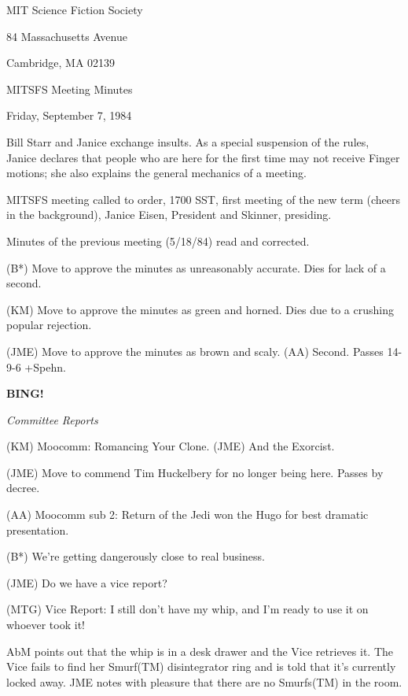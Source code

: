 \documentclass[12pt]{article}
\newcommand{\bing}{{\bf BING!} }
\newcommand{\goto}[1]{\bing \vskip 12pt \centerline{{\em{#1}}}}
\begin{document}
\begin{center}

MIT Science Fiction Society 

84 Massachusetts Avenue

Cambridge, MA 02139

\vspace{12pt}

MITSFS Meeting Minutes 

Friday, September 7, 1984

\end{center}
 
\vspace{18pt}

\setlength{\parskip}{6pt}

\noindent
Bill Starr and Janice exchange insults. As a special suspension of the rules, Janice declares that people who are here for the first time may not receive Finger motions; she also explains the general mechanics of a meeting.

MITSFS meeting called to order, 1700 SST, first meeting of the new term (cheers in the background),
Janice Eisen, President and Skinner, presiding.

Minutes of the previous meeting (5/18/84) read and corrected.

(B*) Move to approve the minutes as unreasonably accurate. Dies for lack of a second.

(KM) Move to approve the minutes as green and horned. Dies due to a crushing popular rejection.

(JME) Move to approve the minutes as brown and scaly. (AA) Second. Passes 14-9-6 +Spehn.

\goto{Committee Reports}

(KM) Moocomm: Romancing Your Clone. (JME) And the Exorcist.

(JME) Move to commend Tim Huckelbery for no longer being here. Passes by decree.

(AA) Moocomm sub 2: Return of the Jedi won the Hugo for best dramatic presentation.

(B*) We're getting dangerously close to real business.

(JME) Do we have a vice report?

(MTG) Vice Report: I still don't have my whip, and I'm ready to use it on whoever took it!

AbM points out that the whip is in a desk drawer and the Vice retrieves it. The Vice fails to find her Smurf(TM) disintegrator ring and is told that it's currently locked away. JME notes with pleasure that there are no Smurfs(TM) in the room.
\end{document}
